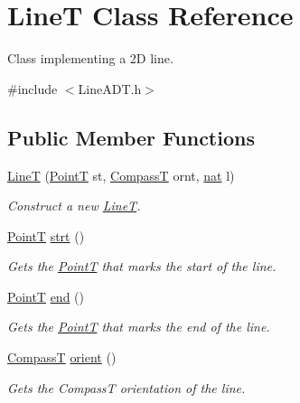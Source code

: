 \hypertarget{class_line_t}{}\section{LineT Class Reference}
\label{class_line_t}


Class implementing a 2D line.  




{\ttfamily \#include $<$Line\+A\+D\+T.\+h$>$}

\subsection*{Public Member Functions}
\begin{DoxyCompactItemize}
\item 
\mbox{\hyperlink{class_line_t_a51d13d4deda368693b417b3b6c5dea46}{LineT}} (\mbox{\hyperlink{class_point_t}{PointT}} st, \mbox{\hyperlink{_map_types_8h_a02f3db508dc0c595c2572f474f14b2fa}{CompassT}} ornt, \mbox{\hyperlink{_path_a_d_t_8h_a56638ee9d162e8cce3a15f92d2023d6e}{nat}} l)
\begin{DoxyCompactList}\small\item\em Construct a new \mbox{\hyperlink{class_line_t}{LineT}}. \end{DoxyCompactList}\item 
\mbox{\hyperlink{class_point_t}{PointT}} \mbox{\hyperlink{class_line_t_a786eea84b67064264d3e70e5c820a134}{strt}} ()
\begin{DoxyCompactList}\small\item\em Gets the \mbox{\hyperlink{class_point_t}{PointT}} that marks the start of the line. \end{DoxyCompactList}\item 
\mbox{\hyperlink{class_point_t}{PointT}} \mbox{\hyperlink{class_line_t_a9030b7ce0f9a9c7d79322fc0adf03bcc}{end}} ()
\begin{DoxyCompactList}\small\item\em Gets the \mbox{\hyperlink{class_point_t}{PointT}} that marks the end of the line. \end{DoxyCompactList}\item 
\mbox{\hyperlink{_map_types_8h_a02f3db508dc0c595c2572f474f14b2fa}{CompassT}} \mbox{\hyperlink{class_line_t_a27377bf25d8fc96b2c25affabd28d72d}{orient}} ()
\begin{DoxyCompactList}\small\item\em Gets the CompassT orientation of the line. \end{DoxyCompactList}\item 

\end{DoxyCompactItemize}
